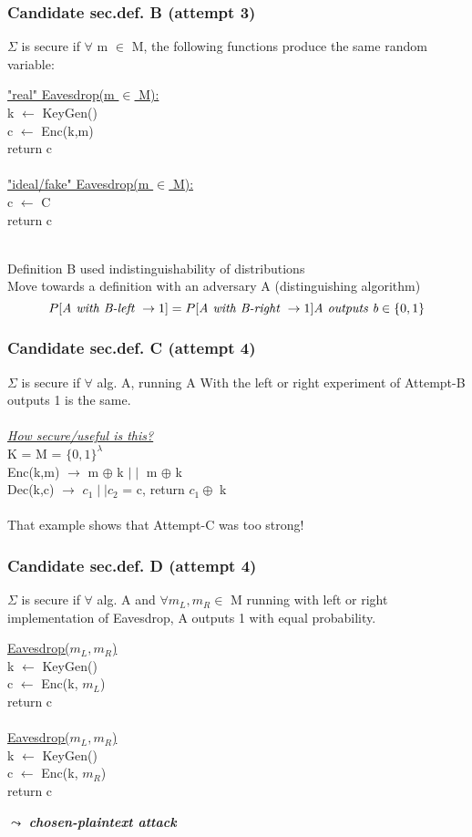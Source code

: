 \documentclass{report}
\begin{document}
 \subsubsection*{Candidate sec.def. B (attempt 3)}
 $\Sigma$ is secure if $\forall$ m $\in$ M, the following functions produce the same random variable:
 \begin{center}
 	\underline{"real" Eavesdrop(m $\in$ M):} \\
 	k $\leftarrow$ KeyGen() \\
 	c $\leftarrow$ Enc(k,m) \\
 	return c  \\
 	\hfill \\
 	\underline{"ideal/fake" Eavesdrop(m $\in$ M):} \\
 	c $\leftarrow$ C \\
 	return c
 \end{center}
 \hfill \\
 Definition B used indistinguishability of distributions \\
 Move towards a definition with an adversary A (distinguishing algorithm) \\
 \[
 	P[\textit{A with B-left } \rightarrow 1] = P[\textit{A with B-right } \rightarrow 1] $$ $$
 	\textit{A outputs b} \in \{ 0,1\}
 \]
 \subsubsection*{Candidate sec.def. C (attempt 4)}
 $\Sigma$ is secure if $\forall$ alg. A, running A With the left or right experiment of Attempt-B outputs 1 is the same. \\ \\
 \textit{\underline{How secure/useful is this?}} \\
 K = M = $\{ 0,1 \}^{\lambda}$ \\
 Enc(k,m) $\rightarrow$ m $\oplus$ k $\mid \mid $ m $\oplus$ k \\
 Dec(k,c) $\rightarrow$ $c_1 \mid \mid c_2$ = c, return $c_1 \oplus$ k \\ \\
 That example shows that Attempt-C was too strong!
 \subsubsection*{Candidate sec.def. D (attempt 4)}
 $\Sigma$ is secure if $\forall$ alg. A and $\forall m_L, m_R \in$ M running with left or right implementation of Eavesdrop, A outputs 1 with equal probability.
 \begin{center}
 	\underline{Eavesdrop($m_L, m_R$)} \\
 	k $\leftarrow$ KeyGen() \\
 	c $\leftarrow$ Enc(k, $m_L$) \\
 	return c \\ 
 	\hfill \\
 	\underline{Eavesdrop($m_L, m_R$)} \\
 	k $\leftarrow$ KeyGen() \\
 	c $\leftarrow$ Enc(k, $m_R$) \\
 	return c
 \end{center}
 $\leadsto$ \textit{\textbf{chosen-plaintext attack}}
\end{document}
